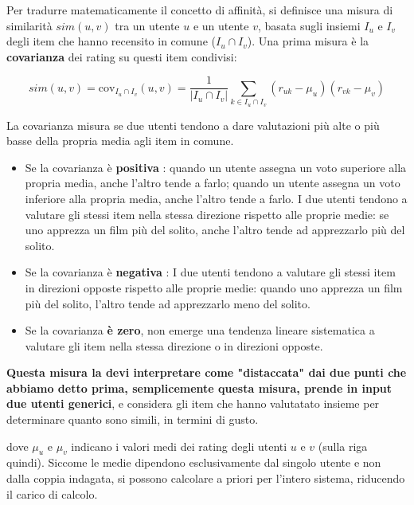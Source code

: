 Per tradurre matematicamente il concetto di affinità, si definisce una misura di similarità $sim(u,v)$ tra un utente $u$ e un utente $v$, basata sugli insiemi $I_u$ e $I_v$ degli item che hanno recensito in comune ($I_u \cap I_v$).
Una prima misura è la \textbf{covarianza} dei rating su questi item condivisi:


$$sim(u,v) = \text{cov}_{I_u \cap I_v}(u,v) = \frac{1}{\vert{}I_u \cap I_v\vert{}} \sum_{k \in I_u \cap I_v} (r_{uk} - \mu_u)(r_{vk} - \mu_v)$$

La covarianza misura se due utenti tendono a dare valutazioni più alte o più basse della propria media agli item in comune.

\begin{itemize}
    \item Se la covarianza è \textbf{positiva} : quando un utente assegna un voto superiore alla propria media, anche l'altro tende a farlo;
    quando un utente assegna un voto inferiore alla propria media, anche l'altro tende a farlo.
    I due utenti tendono a valutare gli stessi item nella stessa direzione rispetto alle proprie medie: se uno apprezza un film più del solito, anche l'altro tende ad apprezzarlo più del solito.
    \item Se la covarianza è \textbf{negativa} : I due utenti tendono a valutare gli stessi item in direzioni opposte rispetto alle proprie medie: quando uno apprezza un film più del solito, l'altro tende ad apprezzarlo meno del solito.
    \item Se la covarianza \textbf{è zero}, non emerge una tendenza lineare sistematica a valutare gli item nella stessa direzione o in direzioni opposte.
\end{itemize}


\begin{center}
\textbf{Questa misura la devi interpretare come "distaccata" dai due punti che abbiamo detto prima, semplicemente questa misura, prende in input due utenti generici}, e considera gli item che hanno valutatato insieme per determinare quanto sono simili, in termini di gusto.
\end{center}

\begin{center}
dove $\mu_u$ e $\mu_v$ indicano i valori medi dei rating degli utenti $u$ e $v$ (sulla riga quindi). Siccome le medie dipendono esclusivamente dal singolo utente e non dalla coppia indagata, si possono calcolare a priori per l'intero sistema, riducendo il carico di calcolo.
\end{center}


